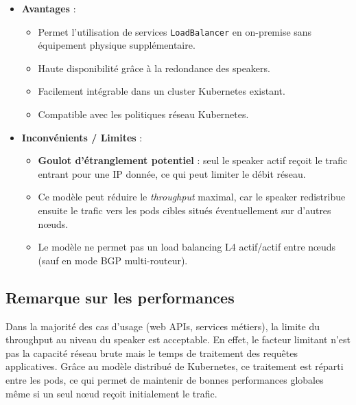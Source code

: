 \begin{itemize}
	\item \textbf{Avantages} :
	      \begin{itemize}
		      \item Permet l’utilisation de services \texttt{LoadBalancer} en on-premise sans équipement physique supplémentaire.
		      \item Haute disponibilité grâce à la redondance des speakers.
		      \item Facilement intégrable dans un cluster Kubernetes existant.
		      \item Compatible avec les politiques réseau Kubernetes.
	      \end{itemize}

	\item \textbf{Inconvénients / Limites} :
	      \begin{itemize}
		      \item \textbf{Goulot d’étranglement potentiel} : seul le speaker actif reçoit le trafic entrant pour une IP donnée, ce qui peut limiter le débit réseau.
		      \item Ce modèle peut réduire le \emph{throughput} maximal, car le speaker redistribue ensuite le trafic vers les pods cibles situés éventuellement sur d'autres nœuds.
		      \item Le modèle ne permet pas un load balancing L4 actif/actif entre nœuds (sauf en mode BGP multi-routeur).
	      \end{itemize}
\end{itemize}

\subsection{Remarque sur les performances}

Dans la majorité des cas d’usage (web APIs, services métiers), la limite du throughput au niveau du speaker est acceptable. En effet, le facteur limitant n’est pas la capacité réseau brute mais le temps de traitement des requêtes applicatives. Grâce au modèle distribué de Kubernetes, ce traitement est réparti entre les pods, ce qui permet de maintenir de bonnes performances globales même si un seul nœud reçoit initialement le trafic.


